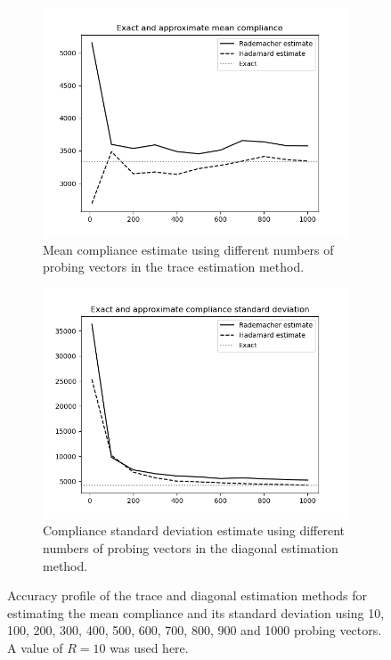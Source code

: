 \begin{figure}
  \begin{subfigure}[t]{0.45\textwidth}
    \centering
    \includegraphics[width=1\textwidth]{./images/robust_approx/exact_approx_mean.png}
    \caption{Mean compliance estimate using different numbers of probing vectors in the trace estimation method.}
    \label{fig:exact_approx_mean}
  \end{subfigure} \hfill
  \begin{subfigure}[t]{0.45\textwidth}
    \centering
    \includegraphics[width=1\textwidth]{./images/robust_approx/exact_approx_std.png}
    \caption{Compliance standard deviation estimate using different numbers of probing vectors in the diagonal estimation method.}
    \label{fig:exact_approx_std}
  \end{subfigure}
  \caption{Accuracy profile of the trace and diagonal estimation methods for estimating the mean compliance and its standard deviation using 10, 100, 200, 300, 400, 500, 600, 700, 800, 900 and 1000 probing vectors. A value of $R = 10$ was used here.}
  \label{fig:exact_approx}
\end{figure}

